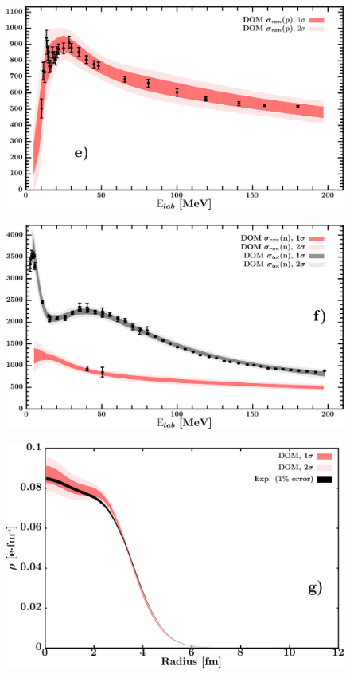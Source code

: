 \documentclass[twocolumn,secnumarabic,amssymb, nobibnotes, aps, prl,
superscriptaddress, nobalancelastpage, draft]{revtex4}
\begin{document}
\begin{figure}[!htb]
\begin{minipage}{0.4\linewidth}
        \label{DOM_ca40_neutron_elastic}
    \end{minipage}
    \centering
    \begin{minipage}{0.4\linewidth}
        \centering
        \includegraphics[width=\linewidth]{figures/ca40_protonInelastic.png}
        \label{DOM_ca40_proton_inelastic}
    \end{minipage}\hspace{6pt}
    \begin{minipage}{0.4\linewidth}
        \centering
        \includegraphics[width=\linewidth]{figures/ca40_neutronInelastic.png}
        \label{DOM_ca40_neutron_inelastic}
    \end{minipage}
    \centering
    \begin{minipage}{0.4\linewidth}
        \centering
        \includegraphics[width=\linewidth]{figures/ca40_chargeDensity.png}

\end{minipage}
\end{figure}
\end{document}
